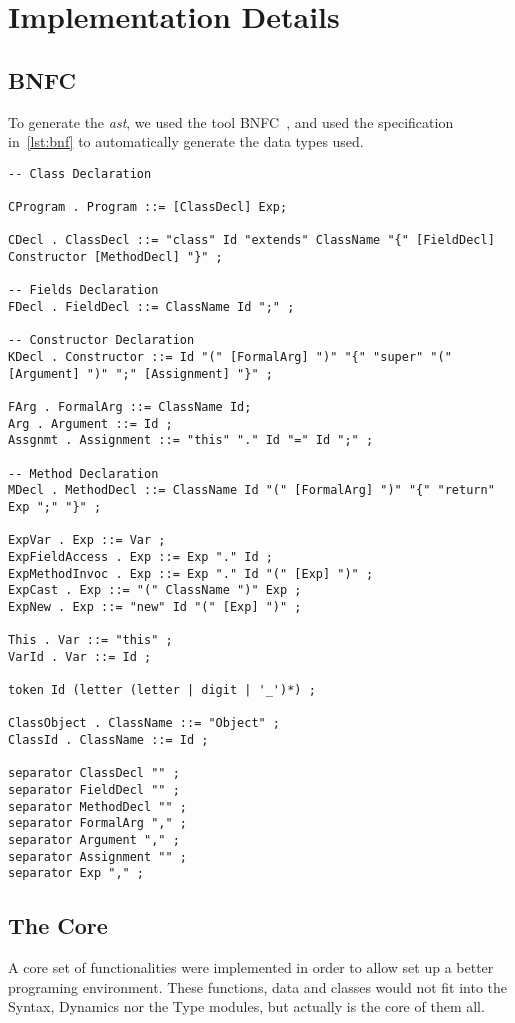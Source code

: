 \chapter{Implementation Details}
\section{BNFC}
To generate the \textit{ast}, we used the tool BNFC~\cite{bnfc}, and used the
specification in~\cref{lst:bnf} to automatically generate the data types used.

\begin{lstlisting}[frame=single, caption={BNF Specification}, label={lst:bnf}, float, floatplacement=H]
-- Class Declaration

CProgram . Program ::= [ClassDecl] Exp;

CDecl . ClassDecl ::= "class" Id "extends" ClassName "{" [FieldDecl] Constructor [MethodDecl] "}" ;

-- Fields Declaration
FDecl . FieldDecl ::= ClassName Id ";" ;

-- Constructor Declaration
KDecl . Constructor ::= Id "(" [FormalArg] ")" "{" "super" "(" [Argument] ")" ";" [Assignment] "}" ;

FArg . FormalArg ::= ClassName Id;
Arg . Argument ::= Id ;
Assgnmt . Assignment ::= "this" "." Id "=" Id ";" ;

-- Method Declaration
MDecl . MethodDecl ::= ClassName Id "(" [FormalArg] ")" "{" "return" Exp ";" "}" ;

ExpVar . Exp ::= Var ;
ExpFieldAccess . Exp ::= Exp "." Id ; 
ExpMethodInvoc . Exp ::= Exp "." Id "(" [Exp] ")" ;
ExpCast . Exp ::= "(" ClassName ")" Exp ;
ExpNew . Exp ::= "new" Id "(" [Exp] ")" ;

This . Var ::= "this" ;
VarId . Var ::= Id ; 

token Id (letter (letter | digit | '_')*) ;

ClassObject . ClassName ::= "Object" ;
ClassId . ClassName ::= Id ;

separator ClassDecl "" ;
separator FieldDecl "" ;
separator MethodDecl "" ;
separator FormalArg "," ;
separator Argument "," ;
separator Assignment "" ;
separator Exp "," ;
\end{lstlisting}

\section{The Core}
A core set of functionalities were implemented in order to allow set up a
better programing environment. These functions, data and classes would not fit
into the Syntax, Dynamics nor the Type modules, but actually is the core of them all.

